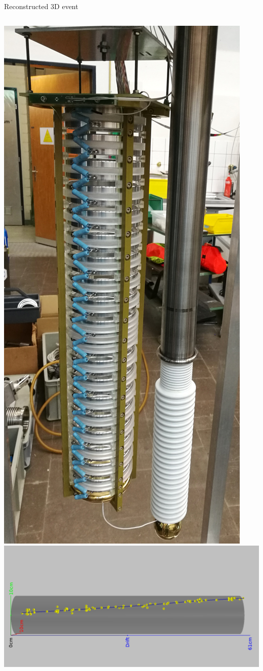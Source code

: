 \documentclass[]{beamer}
\begin{document}
\begin{frame}{Reconstructed 3D event}
\begin{columns}[c]
		\includegraphics[height=.8\textheight]{viper/viper_original}
		\centering
		\includegraphics[width=.8\textheight, angle=-90]{defence/event967_kalman}

\end{columns}
\end{frame}
\end{document}
